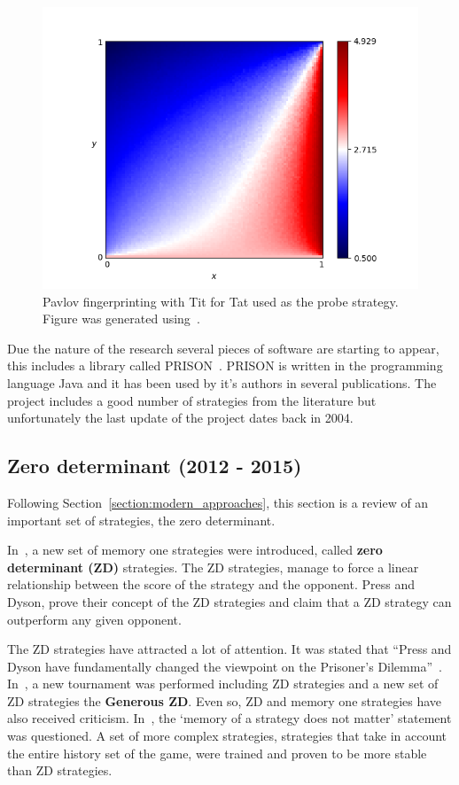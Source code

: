 \documentclass{article}
\begin{document}
\begin{figure}[!hbtp]
    \centering
    \includegraphics[height=.3\textheight]{./assets/images/Win-Stay_Lose-Shift.png}
    \caption{Pavlov fingerprinting with Tit for Tat used as the probe strategy.
    Figure was generated using~\cite{axelrodproject}.}
    \label{fig:fingerprinting}
\end{figure}

Due the nature of the research several pieces of software are starting to appear,
this includes a library called PRISON~\cite{prison}. PRISON is written in the
programming language Java and it has been used by it's authors in several
publications. The project includes a good number of strategies from the 
literature but unfortunately the last update of the project dates back in 2004.

\subsection{Zero determinant (2012 - 2015)}

Following Section~\ref{section:modern_approaches}, this section is a review
of an important set of strategies, the zero determinant. 

In~\cite{Press2012}, a new set of memory one strategies were introduced, called
\textbf{zero determinant (ZD)} strategies. The ZD strategies,
manage to force a linear relationship between the score of the strategy
and the opponent. Press and Dyson, prove their concept of the ZD strategies
and claim that a ZD strategy can outperform any given opponent.

The ZD strategies have attracted a lot of attention. It was stated that
``Press and Dyson have fundamentally changed the viewpoint on the Prisoner's
Dilemma''~\cite{Stewart2012}. In~\cite{Stewart2012}, a new tournament was
performed including ZD strategies and a new set of ZD 
strategies the \textbf{Generous ZD}. Even so, ZD and memory one strategies have
also received criticism. In~\cite{Lee2015}, the `memory of a strategy does
not matter' statement was questioned. A set of more complex strategies,
strategies that take in account the entire history set of the game, were
trained and proven to be more stable than ZD strategies.
\end{document}
